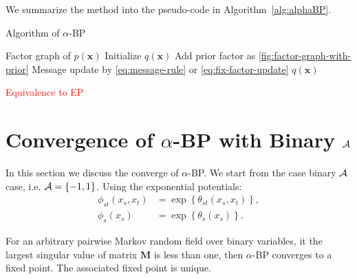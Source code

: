 \documentclass[conference,onecolumn]{IEEEtran}
\begin{document}
We summarize the method into the pseudo-code in Algorithm~\autoref{alg:alphaBP}.
\begin{algorithm}
  \caption{Algorithm of $\alpha$-BP}\label{alg:alphaBP}
  \begin{algorithmic}[1]
    \renewcommand{\algorithmicrequire}{\textbf{Input:}}
    \renewcommand{\algorithmicensure}{\textbf{Output:}}
    \REQUIRE Factor graph of $p(\bm{x})$
    \STATE Initialize $q(\bm{x})$
    \STATE Add prior factor as \autoref{fig:factor-graph-with-prior}
    \ENDIF
    \STATE Message update by \autoref{eq:message-rule} or \autoref{eq:fix-factor-update}
    \ENDFOR
    \ENDWHILE
    \RETURN $q(\bm{x})$ 
  \end{algorithmic} 
\end{algorithm}

\textcolor{red}{Equivalence to EP}
\section{Convergence of $\alpha$-BP with Binary $\mathcal{A}$}
In this section we discuss the converge of $\alpha$-BP. We start from the case binary $\mathcal{A}$ case, i.e. $\mathcal{A}=\left\{ -1, 1 \right\}$. Using the exponential potentials:
\begin{align}
  \phi_{st}(x_s, x_t) &= \exp\left\{ \theta_{st}(x_s, x_t)\right\}, \\
  \phi_{s}(x_s) &= \exp\left\{ \theta_{s}(x_s) \right\}.
\end{align}

\begin{thm}
  For an arbitrary pairwise Markov random field over binary variables,
  it the largest singular value of matrix $\bm{M}$ is less than one,
  then $\alpha$-BP converges to a fixed point. The associated fixed
  point is unique.
\end{thm}
\end{document}
